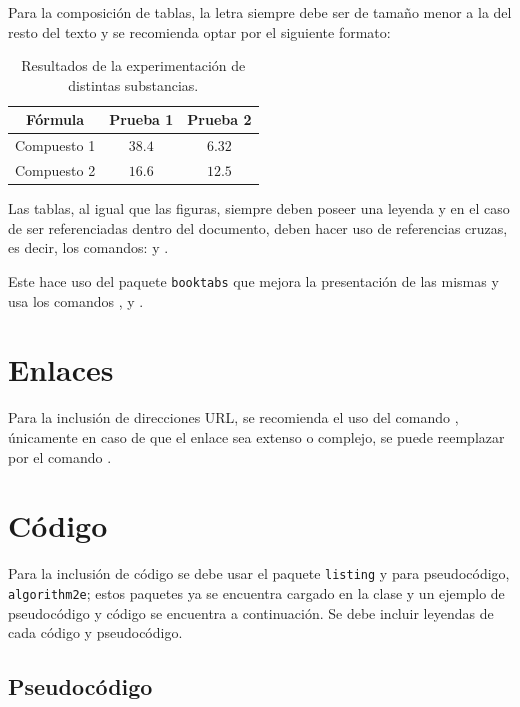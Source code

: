 \documentclass{aleph-revista}
\begin{document}
Para la composición de tablas, la letra siempre debe ser de tamaño menor a la del resto del texto y se recomienda optar por el siguiente formato:

\begin{table}[H]
    \centering\small
    \begin{tabular}{ccc}
    \toprule
        \textbf{Fórmula} & \textbf{Prueba 1} & \textbf{Prueba 2} \\ 
    \midrule
        Compuesto 1 & $38.4$  &  $6.32$\\ 
        Compuesto 2 & $16.6$ & $12.5$ \\ 
    \bottomrule
    \end{tabular}
    \label{tab:01}
    \caption{Resultados de la experimentación de distintas substancias.}
\end{table}

Las tablas, al igual que las figuras, siempre deben poseer una leyenda y en el caso de ser referenciadas dentro del documento, deben hacer uso de referencias cruzas, es decir, los comandos: \verb@{} y \verb@{}.


Este hace uso del paquete \texttt{booktabs} que mejora la presentación de las mismas y usa los comandos \verb@\toprule@, \verb@\midrule@ y \verb@\bottomrule@.

\section{Enlaces}

Para la inclusión de direcciones URL, se recomienda el uso del comando \verb@\url@, únicamente en caso de que el enlace sea extenso o complejo, se puede reemplazar por el comando \verb@\href@.

\section{Código}

Para la inclusión de código se debe usar el paquete \texttt{listing} y para pseudocódigo, \texttt{algorithm2e}; estos paquetes ya se encuentra cargado en la clase y un ejemplo de pseudocódigo y código se encuentra a continuación. Se debe incluir leyendas de cada código y pseudocódigo.

\subsection{Pseudocódigo} 
\end{document}
